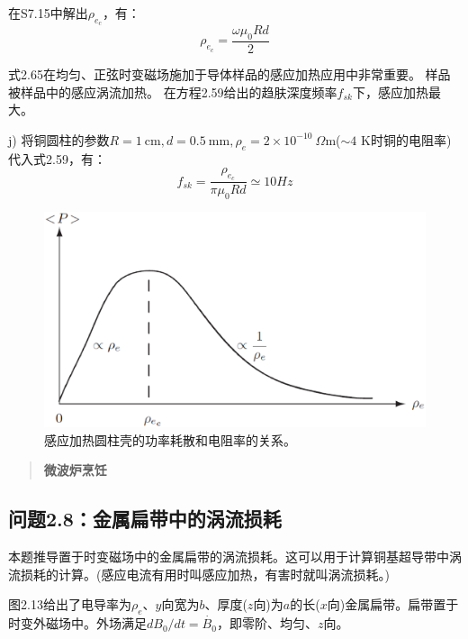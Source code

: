 在S7.15中解出$\rho_{e_c}$，有：
\begin{equation*}
\rho_{e_c}=\frac{\omega \mu_0 R d}{2} \tag{2.65}
\end{equation*}

式2.65在均匀、正弦时变磁场施加于导体样品的感应加热应用中非常重要。
样品被样品中的感应涡流加热。
在方程2.59给出的趋肤深度频率$f_{sk}$下，感应加热最大。

j) 将铜圆柱的参数$R=1\ \mathrm{cm}, d=0.5\ \mathrm{mm},\rho_e=2\times 10^{-10}\ \Omega\mathrm{m}$($\sim 4$ K时铜的电阻率)代入式2.59，有：
\begin{equation*}
f_{sk}=\frac{\rho_{e_c}}{\pi\mu_0 R d}\simeq 10Hz \tag{2.59}
\end{equation*}

\begin{figure}[htbp]
  \centering
 \includegraphics[scale=0.4]{chpt2/figs/fig2.12.eps}
  \caption{感应加热圆柱壳的功率耗散和电阻率的关系。}
\end{figure}

\begin{quotation}
\textbf{微波炉烹饪}\ 
\end{quotation}


\subsection{问题2.8：金属扁带中的涡流损耗}
本题推导置于时变磁场中的金属扁带的涡流损耗。这可以用于计算铜基超导带中涡流损耗的计算。(感应电流有用时叫感应加热，有害时就叫涡流损耗。)

图2.13给出了电导率为$\rho_e$、$y$向宽为$b$、厚度($z$向)为$a$的长($x$向)金属扁带。扁带置于时变外磁场中。外场满足$dB_0/dt=\dot{B_0}$，即零阶、均匀、$z$向。

